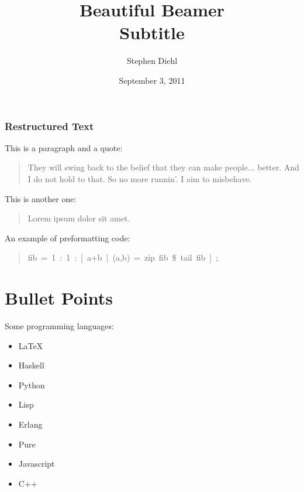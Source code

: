 \documentclass[t,english]{beamer}
\begin{document}
\title[Beautiful Beamer]{Beautiful Beamer%
  \label{beautiful-beamer}%
  \\ %
  \large{Subtitle}%
  \label{subtitle}}
\author[Stephen Diehl]{Stephen Diehl}
\date{September 3, 2011}
\maketitle

\begin{frame}[fragile]
\frametitle{Restructured Text}


This is a paragraph and a quote:
%
\begin{quote}

They will swing back to the belief that they can make people... better. And I do not hold to that. So no more runnin'. I aim to misbehave.

\end{quote}

This is another one:
%
\begin{quote}

Lorem ipsum dolor sit amet.

\end{quote}

An example of preformatting code:
%
\begin{quote}{\ttfamily \raggedright \noindent
fib~=~1~:~1~:~{[}~a+b~|~(a,b)~=~zip~fib~\$~tail~fib~{]}~;
}
\end{quote}

\end{frame}



\section*{Bullet Points}

Some programming languages:
\begin{itemize}

\item LaTeX

\item Haskell

\item Python

\item Lisp

\item Erlang

\item Pure

\item Javascript

\item C++
\end{itemize}
\end{document}
